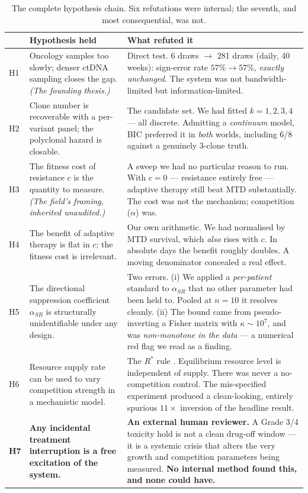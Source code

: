 \documentclass[11pt,a4paper]{article}
\begin{document}
\begin{table}[h]
\centering
\small
\begin{tabular}{p{0.9cm}p{5.4cm}p{7.4cm}}
\toprule
& \textbf{Hypothesis held} & \textbf{What refuted it}\\
\midrule
H1 & Oncology samples too slowly; denser ctDNA sampling closes the gap. \emph{(The founding thesis.)} & Direct test. 6 draws $\to$ 281 draws (daily, 40 weeks): sign-error rate $57\% \to 57\%$, \emph{exactly unchanged}. The system was not bandwidth-limited but information-limited.\\
\addlinespace
H2 & Clone number is recoverable with a per-variant panel; the polyclonal hazard is closable. & The candidate set. We had fitted $k=1,2,3,4$ --- all discrete. Admitting a \emph{continuum} model, BIC preferred it in \emph{both} worlds, including 6/8 against a genuinely 3-clone truth.\\
\addlinespace
H3 & The fitness cost of resistance $c$ is the quantity to measure. \emph{(The field's framing, inherited unaudited.)} & A sweep we had no particular reason to run. With $c = 0$ --- resistance entirely free --- adaptive therapy still beat MTD substantially. The cost was not the mechanism; competition ($\alpha$) was.\\
\addlinespace
H4 & The benefit of adaptive therapy is flat in $c$; the fitness cost is irrelevant. & Our own arithmetic. We had normalised by MTD survival, which \emph{also} rises with $c$. In absolute days the benefit roughly doubles. A moving denominator concealed a real effect.\\
\addlinespace
H5 & The directional suppression coefficient $\alpha_{SR}$ is structurally unidentifiable under any design. & Two errors. (i) We applied a \emph{per-patient} standard to $\alpha_{SR}$ that no other parameter had been held to. Pooled at $n=10$ it resolves cleanly. (ii) The bound came from pseudo-inverting a Fisher matrix with $\kappa \sim 10^7$, and was \emph{non-monotone in the data} --- a numerical red flag we read as a finding.\\
\addlinespace
H6 & Resource supply rate can be used to vary competition strength in a mechanistic model. & The $R^*$ rule \citep{tilman1982resource}. Equilibrium resource level is independent of supply. There was never a no-competition control. The mis-specified experiment produced a clean-looking, entirely spurious $11\times$ inversion of the headline result.\\
\addlinespace
\textbf{H7} & \textbf{Any incidental treatment interruption is a free excitation of the system.} & \textbf{An external human reviewer.} A Grade 3/4 toxicity hold is not a clean drug-off window --- it is a systemic crisis that alters the very growth and competition parameters being measured. \textbf{No internal method found this, and none could have.}\\
\bottomrule
\end{tabular}
\caption{The complete hypothesis chain. Six refutations were internal; the seventh, and
most consequential, was not.}
\label{tab:chain}
\end{table}
\end{document}
